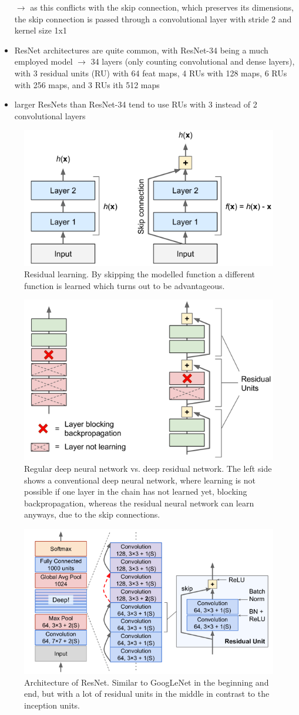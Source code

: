 \documentclass[12pt,a4paper]{article}
\begin{document}
\begin{itemize}
  \newline \indent $\longrightarrow$ as this conflicts with the skip connection, which preserves its dimensions, the skip connection is passed through a convolutional layer with stride 2 and kernel size 1x1
  \item ResNet architectures are quite common, with ResNet-34 being a much employed model
  \newline \indent $\longrightarrow$ 34 layers (only counting convolutional and dense layers), with 3 residual units (RU) with 64 feat maps, 4 RUs with 128 maps, 6 RUs with 256 maps, and 3 RUs ith 512 maps
  \item larger ResNets than ResNet-34 tend to use RUs with 3 instead of 2 convolutional layers
\end{itemize}
\begin{figure}
  \centering
  \includegraphics[width=.5\linewidth]{Images/residual_learning.png}
  \caption[Residual learning]{Residual learning. By skipping the modelled function a different function is learned which turns out to be advantageous.}
  \label{fig:reslern}
\end{figure}
\begin{figure}
  \centering
  \includegraphics[width=.5\linewidth]{Images/CNN_RNN.png}
  \caption[Regular deep neural network vs. deep residual network]{Regular deep neural network vs. deep residual network. The left side shows a conventional deep neural network, where learning is not possible if one layer in the chain has not learned yet, blocking backpropagation, whereas the residual neural network can learn anyways, due to the skip connections.}
  \label{fig:CNN_RNN}
\end{figure}
\begin{figure}
  \centering
  \includegraphics[width=.5\linewidth]{Images/ResNet.png}
  \caption[Architecture of ResNet]{Architecture of ResNet. Similar to GoogLeNet in the beginning and end, but with a lot of residual units in the middle in contrast to the inception units.}
  \label{fig:ResNet}
\end{figure}
\end{document}
